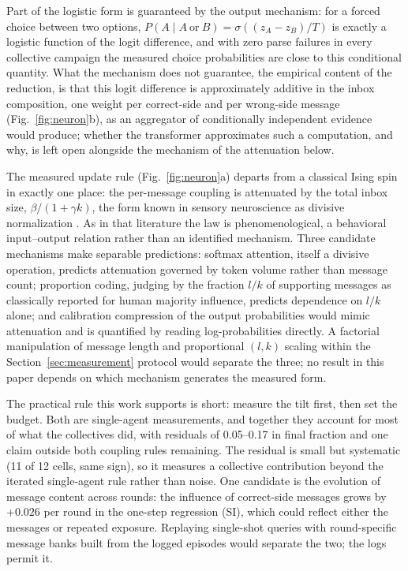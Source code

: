 \documentclass[11pt]{article}
\begin{document}
Part of the logistic form is guaranteed by the output mechanism: for a
forced choice between two options, $P(A \mid A\ \text{or}\ B) =
\sigma((z_A - z_B)/T)$ is exactly a logistic function of the logit
difference, and with zero parse failures in every collective campaign the
measured choice probabilities are close to this conditional quantity. What
the mechanism does not guarantee, the empirical content of the reduction, is
that this logit difference is approximately additive in the inbox
composition, one weight per correct-side and per wrong-side message
(Fig.~\ref{fig:neuron}b), as an aggregator of conditionally independent
evidence would produce; whether the transformer approximates such a
computation, and why, is left open alongside the mechanism of the
attenuation below.

The measured update rule (Fig.~\ref{fig:neuron}a) departs from a classical
Ising spin in exactly one place: the per-message coupling is attenuated by
the total inbox size, $\beta/(1+\gamma k)$, the form known in sensory
neuroscience as divisive normalization \citep{CarandiniHeeger2012}. As in
that literature the law is phenomenological, a behavioral input--output
relation rather than an identified mechanism. Three candidate mechanisms
make separable predictions: softmax attention, itself a divisive operation,
predicts attenuation governed by token volume rather than message count;
proportion coding, judging by the fraction $l/k$ of supporting messages as
classically reported for human majority influence, predicts dependence on
$l/k$ alone; and calibration compression of the output probabilities would
mimic attenuation and is quantified by reading log-probabilities directly. A
factorial manipulation of message length and proportional $(l, k)$ scaling
within the Section~\ref{sec:measurement} protocol would separate the three;
no result in this paper depends on which mechanism generates the measured
form.

The practical rule this work supports is short: measure the tilt first, then
set the budget. Both are single-agent measurements, and together they
account for most of what the collectives did, with residuals of 0.05--0.17 in
final fraction and one claim outside both coupling rules remaining. The
residual is small but systematic (11 of 12 cells, same sign), so it measures
a collective contribution beyond the iterated single-agent rule rather than
noise. One candidate is the evolution of message content across rounds: the
influence of correct-side messages grows by $+0.026$ per round in the
one-step regression (SI), which could reflect either the messages or repeated
exposure. Replaying single-shot queries with round-specific message banks
built from the logged episodes would separate the two; the logs permit it.
\end{document}
